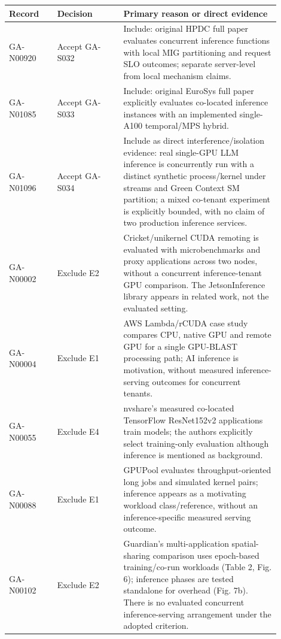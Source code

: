 \begin{longtable}{P{0.16\linewidth}P{0.22\linewidth}P{0.52\linewidth}}\toprule Record & Decision & Primary reason or direct evidence\\\midrule\endhead

GA-N00920 & Accept GA-S032 \cite{fluidfaas} & Include: original HPDC full paper evaluates concurrent inference functions with local MIG partitioning and request SLO outcomes; separate server-level from local mechanism claims.\\

GA-N01085 & Accept GA-S033 \cite{bless} & Include: original EuroSys full paper explicitly evaluates co-located inference instances with an implemented single-A100 temporal/MPS hybrid.\\

GA-N01096 & Accept GA-S034 \cite{interference_deeper} & Include as direct interference/isolation evidence: real single-GPU LLM inference is concurrently run with a distinct synthetic process/kernel under streams and Green Context SM partition; a mixed co-tenant experiment is explicitly bounded, with no claim of two production inference services.\\

GA-N00002 & Exclude E2 & Cricket/unikernel CUDA remoting is evaluated with microbenchmarks and proxy applications across two nodes, without a concurrent inference-tenant GPU comparison. The JetsonInference library appears in related work, not the evaluated setting.\\

GA-N00004 & Exclude E1 & AWS Lambda/rCUDA case study compares CPU, native GPU and remote GPU for a single GPU-BLAST processing path; AI inference is motivation, without measured inference-serving outcomes for concurrent tenants.\\

GA-N00055 & Exclude E4 & nvshare's measured co-located TensorFlow ResNet152v2 applications train models; the authors explicitly select training-only evaluation although inference is mentioned as background.\\

GA-N00088 & Exclude E1 & GPUPool evaluates throughput-oriented long jobs and simulated kernel pairs; inference appears as a motivating workload class/reference, without an inference-specific measured serving outcome.\\

GA-N00102 & Exclude E2 & Guardian's multi-application spatial-sharing comparison uses epoch-based training/co-run workloads (Table 2, Fig. 6); inference phases are tested standalone for overhead (Fig. 7b). There is no evaluated concurrent inference-serving arrangement under the adopted criterion.\\


\end{longtable}
